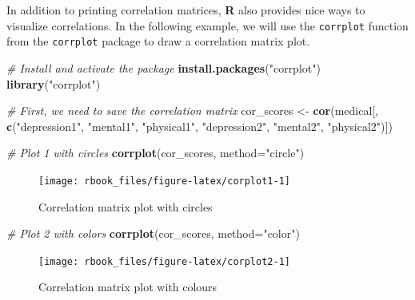 \documentclass[]{book}
\newenvironment{Shaded}{\begin{snugshade}}{\end{snugshade}}
\newcommand{\CommentTok}[1]{\textcolor[rgb]{0.56,0.35,0.01}{\textit{#1}}}
\newcommand{\DataTypeTok}[1]{\textcolor[rgb]{0.13,0.29,0.53}{#1}}
\newcommand{\KeywordTok}[1]{\textcolor[rgb]{0.13,0.29,0.53}{\textbf{#1}}}
\newcommand{\NormalTok}[1]{#1}
\newcommand{\StringTok}[1]{\textcolor[rgb]{0.31,0.60,0.02}{#1}}
\begin{document}
In addition to printing correlation matrices, \textbf{R} also provides nice ways to visualize correlations. In the following example, we will use the \texttt{corrplot} function from the \texttt{corrplot} package \citep{R-corrplot} to draw a correlation matrix plot.

\begin{Shaded}
\begin{Highlighting}[]
\CommentTok{# Install and activate the package}
\KeywordTok{install.packages}\NormalTok{(}\StringTok{"corrplot"}\NormalTok{)}
\KeywordTok{library}\NormalTok{(}\StringTok{"corrplot"}\NormalTok{)}
\end{Highlighting}
\end{Shaded}

\begin{Shaded}
\begin{Highlighting}[]
\CommentTok{# First, we need to save the correlation matrix}
\NormalTok{cor_scores <-}\StringTok{ }\KeywordTok{cor}\NormalTok{(medical[, }\KeywordTok{c}\NormalTok{(}\StringTok{"depression1"}\NormalTok{, }\StringTok{"mental1"}\NormalTok{, }\StringTok{"physical1"}\NormalTok{, }
                              \StringTok{"depression2"}\NormalTok{, }\StringTok{"mental2"}\NormalTok{, }\StringTok{"physical2"}\NormalTok{)])}

\CommentTok{# Plot 1 with circles}
\KeywordTok{corrplot}\NormalTok{(cor_scores, }\DataTypeTok{method=}\StringTok{"circle"}\NormalTok{)}
\end{Highlighting}
\end{Shaded}

\begin{figure}

{\centering \texttt{[image: rbook\_files/figure-latex/corplot1-1]} 

}

\caption{Correlation matrix plot with circles}\label{fig:corplot1}
\end{figure}

\begin{Shaded}
\begin{Highlighting}[]
\CommentTok{# Plot 2 with colors}
\KeywordTok{corrplot}\NormalTok{(cor_scores, }\DataTypeTok{method=}\StringTok{"color"}\NormalTok{)}
\end{Highlighting}
\end{Shaded}

\begin{figure}

{\centering \texttt{[image: rbook\_files/figure-latex/corplot2-1]} 

}

\caption{Correlation matrix plot with colours}\label{fig:corplot2}
\end{figure}
\end{document}
